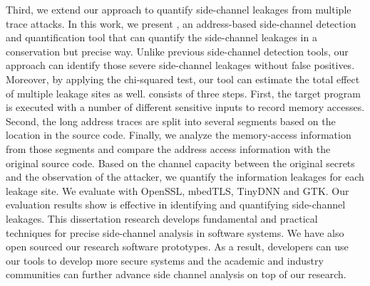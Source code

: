 Third, we extend our approach to quantify side-channel leakages from multiple trace attacks. In this work, we present \ctool{}, an address-based side-channel detection and quantification tool that can quantify the side-channel leakages in a conservation but precise way. Unlike previous side-channel detection tools, our approach can identify those severe side-channel leakages without false positives. Moreover, by applying the chi-squared test, our tool can estimate the total effect of multiple leakage sites as well. \ctool{} consists of three steps. First, the target program is executed with a number of different sensitive inputs to record memory accesses. Second, the long address traces are split into several segments based on the location in the source code. Finally, we analyze the memory-access information from those segments and compare the address access information with the original source code. Based on the channel capacity between the original secrets and the observation of the attacker, we quantify the information leakages for each leakage site. We evaluate \ctool{} with OpenSSL, mbedTLS, TinyDNN and GTK. Our evaluation results show \ctool{} is effective in identifying and quantifying side-channel leakages. This dissertation research develops fundamental and practical techniques for precise side-channel analysis in software systems. We have also open sourced our research software prototypes. As a result, developers can use our tools to develop more secure systems and the academic and industry communities can further advance side channel analysis on top of our research.
